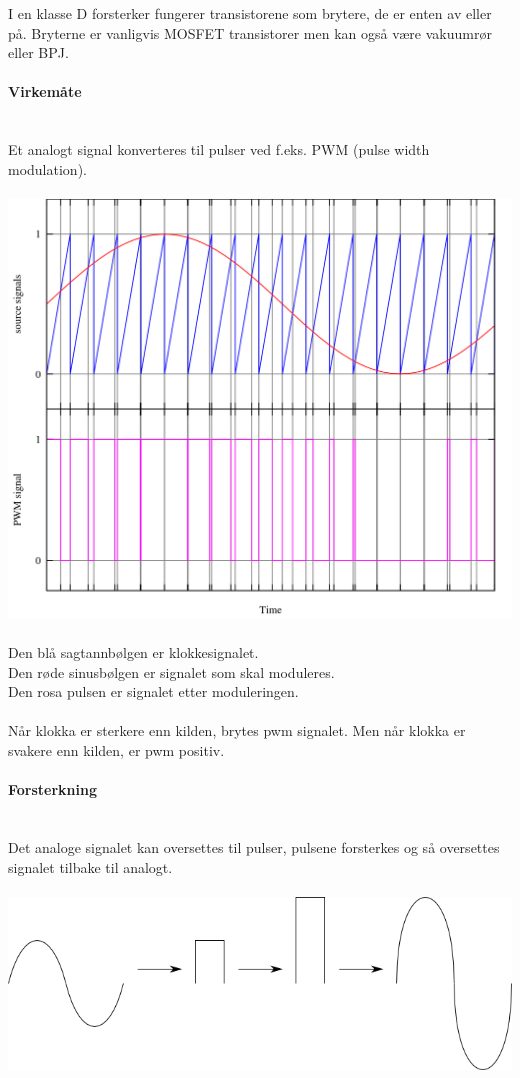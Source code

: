I en klasse D forsterker fungerer transistorene som brytere, de er enten av
eller på.
Bryterne er vanligvis MOSFET transistorer men kan også være vakuumrør eller BPJ.



\paragraph{Virkemåte} \mbox{} \\
Et analogt signal konverteres til pulser ved f.eks. PWM (pulse width
modulation).
\\\\
\includegraphics[width=\textwidth]{./img/pwm}
\\\\
Den blå sagtannbølgen er klokkesignalet. \\
Den røde sinusbølgen er signalet som skal moduleres. \\
Den rosa pulsen er signalet etter moduleringen. \\
\\
Når klokka er sterkere enn kilden, brytes pwm signalet.
Men når klokka er svakere enn kilden, er pwm positiv.



\paragraph{Forsterkning} \mbox{} \\
Det analoge signalet kan oversettes til pulser, pulsene forsterkes og
så oversettes signalet tilbake til analogt.
\\\\
\includegraphics[width=\textwidth]{./img/Damp}
